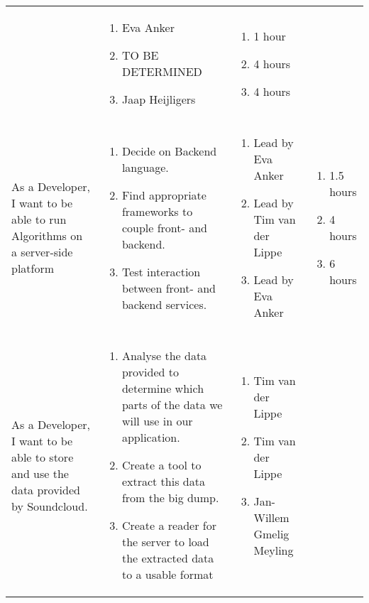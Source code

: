 \documentclass[11pt,a4paper]{article}
\begin{document}
\begin{table}[h]
\begin{tabular}{|p{4.5cm}|p{7cm}|p{4cm}|p{2cm}|}
& 
\begin{enumerate}
\item Eva Anker
\item TO BE DETERMINED
\item Jaap Heijligers
\end{enumerate}

& 
\begin{enumerate}
\item 1 hour
\item 4 hours
\item 4 hours
\end{enumerate} \\

As a Developer, I want to be able to run Algorithms on a server-side platform & \begin{enumerate}
\item Decide on Backend language.
\item Find appropriate frameworks to couple front- and backend.
\item Test interaction between front- and backend services.
\end{enumerate}

& 
\begin{enumerate}
\item Lead by Eva Anker
\item Lead by Tim van der Lippe
\item Lead by Eva Anker
\end{enumerate}

& 
\begin{enumerate}
\item 1.5 hours
\item 4 hours
\item 6 hours
\end{enumerate} \\

As a Developer, I want to be able to store and use the data provided by Soundcloud. & \begin{enumerate}
\item Analyse the data provided to determine which parts of the data we will use in our application.
\item Create a tool to extract this data from the big dump.
\item Create a reader for the server to load the extracted data to a usable format
\end{enumerate}

& 
\begin{enumerate}
\item Tim van der Lippe
\item Tim van der Lippe
\item Jan-Willem Gmelig Meyling
\end{enumerate}


\end{tabular}
\end{table}
\end{document}
